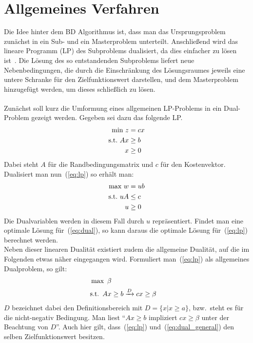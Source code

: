 \documentclass[a4paper, 11pt]{scrreprt}
\begin{document}
\section{Allgemeines Verfahren}
Die Idee hinter dem BD Algorithmus ist, dass man das Ursprungsproblem zunächst in ein
Sub- und ein Masterproblem unterteilt. Anschließend wird das lineare Programm (LP) des
Subproblems dualisiert, da dies einfacher zu lösen ist~\cite{bender}.
Die Lösung des so entstandenden Subproblems liefert neue Nebenbedingungen, die
durch die Einschränkung des Lösungsraumes
jeweils eine untere Schranke für den Zielfunktionswert darstellen, und dem
Masterproblem hinzugefügt werden, um dieses schließlich zu lösen.\\
\\
Zunächst soll kurz die Umformung eines allgemeinen LP-Problems in ein Dual-Problem gezeigt werden.
Gegeben sei dazu das folgende LP.
\begin{align}
  \label{eq:lp}
  \text{min}\,\, z &= cx\notag\\
  \text{s.t.}\,\, Ax &\geq b\\
  x &\geq 0\notag
\end{align}
Dabei steht $A$ für die Randbedingungsmatrix und $c$ für den Kostenvektor.
Dualisiert man nun~(\ref{eq:lp}) so erhält man:
\begin{align}
  \label{eq:dual}
  \text{max}\,\, w &= ub\notag\\
  \text{s.t.}\,\, uA &\leq c\\
  u &\geq 0\notag
\end{align}
Die Dualvariablen werden in diesem Fall durch $u$ repräsentiert. Findet man eine
optimale Lösung für~(\ref{eq:dual}), so kann daraus die optimale Lösung
für~(\ref{eq:lp}) berechnet werden.\\
Neben dieser linearen Dualität existiert zudem die allgemeine Dualität, auf die im
Folgenden etwas näher eingegangen wird. Formuliert man~(\ref{eq:lp}) als allgemeines
Dualproblem, so gilt:
\begin{align}
  \label{eq:dual_general}
\text{max}\,\,\, \beta\\
\text{s.t.}\,\,\, Ax &\geq b \xrightarrow{D} cx \geq \beta\notag
\end{align}
$D$ bezeichnet dabei den Definitionsbereich mit $D = \{x|x \geq a\}$, bzw.\ steht
es für die nicht-negativ Bedingung. Man liest
``$Ax \geq b$ impliziert $cx \geq \beta$ unter der Beachtung von $D$''. Auch hier gilt,
dass~(\ref{eq:lp}) und~(\ref{eq:dual_general}) den selben Zielfunktionswert besitzen.
\end{document}
